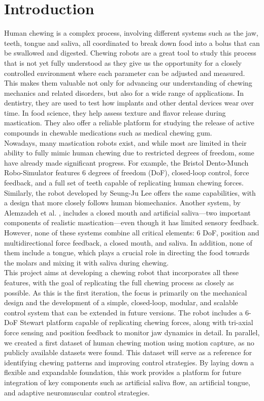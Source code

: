 \section{Introduction}

Human chewing is a complex process, involving different systems such as the jaw, teeth, tongue and saliva, all coordinated to break down food into 
a bolus that can be swallowed and digested. Chewing robots are a great tool to study this process that is not yet fully understood as they give us the opportunity 
for a closely controlled environment where each parameter can be adjusted and measured. This makes them valuable not only for advancing our understanding of 
chewing mechanics and related disorders, but also for a wide range of applications. In dentistry, they are used to test how implants and other dental devices
 wear over time. In food science, they help assess texture and flavor release during mastication. They also offer a reliable platform for studying the release of 
 active compounds in chewable medications such as medical chewing gum.\\
Nowadays, many mastication robots exist, and while most are limited in their ability to fully mimic human chewing due to restricted degrees of freedom, 
some have already made significant progress. For example, the Bristol Dento-Munch Robo-Simulator \cite{BristolChewingRobot} features 6 degrees of freedom 
(DoF), closed-loop control, force feedback, and a full set of teeth capable of replicating human chewing forces. Similarly, the robot developed by Seung-Ju 
Lee \cite{ChewingRobotLinearActuator} offers the same capabilities, with a design that more closely follows human biomechanics. Another system, by Alemzadeh 
et al. \cite{ChewingRobotGums}, includes a closed mouth and artificial saliva—two important components of realistic mastication—even though it has limited 
sensory feedback. However, none of these systems combine all critical elements: 6 DoF, position and multidirectional force feedback, a closed mouth, and 
saliva. In addition, none of them include a tongue, which plays a crucial role in directing the food towards the molars and mixing it with saliva during 
chewing.\\
This project aims at developing a chewing robot that incorporates all these features, with the goal of replicating the full chewing process as closely as 
possible. As this is the first iteration, the focus is primarily on the mechanical design and the development of a simple, closed-loop, modular, and scalable 
control system that can be extended in future versions. The robot includes a 6-DoF Stewart platform capable of replicating chewing forces, along with 
tri-axial force sensing and position feedback to monitor jaw dynamics in detail. In parallel, we created a first dataset of human chewing motion using 
motion capture, as no publicly available datasets were found. This dataset will serve as a reference for identifying chewing patterns and 
improving control strategies. By laying down a flexible and expandable foundation, this work provides a platform for future integration of key components 
such as artificial saliva flow, an artificial tongue, and adaptive neuromuscular control strategies.


